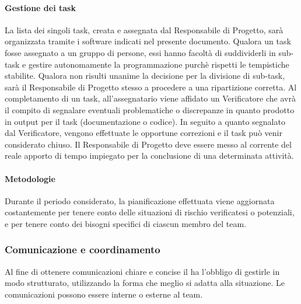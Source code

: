 		\paragraph{Gestione dei task}
		La lista dei singoli task, creata e assegnata dal Responsabile di Progetto, sarà organizzata tramite i software indicati nel presente documento. Qualora un task fosse assegnato a un gruppo di persone, essi hanno facoltà di suddividerli in sub-task e gestire autonomamente la programmazione purchè rispetti le tempistiche stabilite. Qualora non risulti unanime la decisione per la divisione di sub-task, sarà il Responsabile di Progetto stesso a procedere a una ripartizione corretta. Al completamento di un task, all'assegnatario viene affidato un Verificatore che avrà il compito di segnalare eventuali problematiche o discrepanze in quanto prodotto in output per il task (documentazione o codice). In seguito a quanto segnalato dal Verificatore, vengono effettuate le opportune correzioni e il task può venir considerato chiuso. Il Responsabile di Progetto deve essere messo al corrente del reale apporto di tempo impiegato per la conclusione di una determinata attività.
		
		\paragraph{Metodologie}
		Durante il periodo considerato, la pianificazione effettuata viene aggiornata costantemente per tenere conto delle situazioni di rischio verificatesi o potenziali, e per tenere conto dei bisogni specifici di ciascun membro del team.
		
		\subsubsection{Comunicazione e coordinamento}
		Al fine di ottenere comunicazioni chiare e concise il \textit{\RdP} ha l'obbligo di gestirle in modo strutturato, utilizzando la forma che meglio si adatta alla situazione. Le comunicazioni possono essere interne o esterne al team.
			
